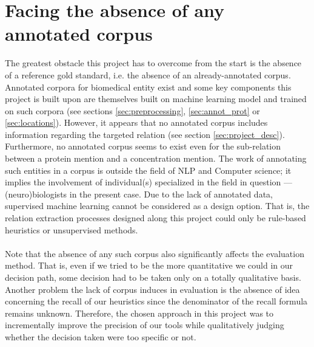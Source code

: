 \documentclass{report}
\begin{document}
				\section{Facing the absence of any annotated corpus}
		The greatest obstacle this project has to overcome from the start
		is the absence of a reference gold standard, i.e. the absence of
		an already-annotated corpus. Annotated corpora for biomedical entity exist and some key components this project is
		built upon are themselves built on machine learning
		model and trained on such corpora (see sections \ref{sec:preprocessing}, 
		\ref{sec:annot_prot} or \ref{sec:locations}). However, it appears that no annotated corpus includes
		information regarding the targeted relation (see section \ref{sec:project_desc}). 
		Furthermore, no annotated corpus seems to
		exist even for the sub-relation between a protein mention and a concentration mention. 
		The work of annotating such entities in a corpus is outside the field of NLP and Computer
		science; it implies the involvement of individual(s) specialized in the field in question ---
		(neuro)biologists in the present case. Due to the lack of annotated data, 
		supervised machine learning cannot be considered as a design option. That is, the relation extraction processes designed along this project could only be 
		rule-based heuristics or unsupervised methods. 
		
		\paragraph{}Note that the absence of any such corpus also significantly
		affects the evaluation method. That is, even if we tried to be
                the more quantitative we could in our decision path, some decision had to be taken only on a totally
                qualitative basis. Another problem the lack of corpus induces in evaluation is the absence of
                idea concerning the recall of our heuristics since the denominator of the recall formula remains
                unknown. Therefore, the chosen approach in this project was to incrementally improve the precision
                of our tools while qualitatively judging whether the decision taken were too specific or not.
				
				
				
					
\end{document}
